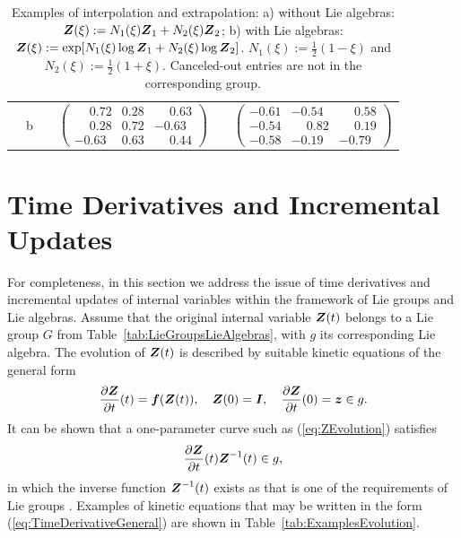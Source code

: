 \documentclass[12pt]{article}
\begin{document}
\begin{table}[htbp]
\begin{center}
\begin{tabular}{ c c c c c c}
      &
      \multirow{2}{*}{b}
      &

      &
      \multirow{2}{*}{
        $\left(
          \begin{smallmatrix}
            \phantom{-}0.72 & 0.28 & \phantom{-}0.63\\
            \phantom{-}0.28 & 0.72 & -0.63\\
            -0.63 & 0.63 & \phantom{-}0.44
          \end{smallmatrix}
        \right)$}
      &

      &
      \multirow{2}{*}{
        $\left(
          \begin{smallmatrix}
            -0.61 & -0.54 & \phantom{-}0.58\\
            -0.54 & \phantom{-}0.82 & \phantom{-}0.19\\
            -0.58 & -0.19 & -0.79
          \end{smallmatrix}
        \right)$}
      \\
      \\
      \bottomrule
    \end{tabular}
    \caption{Examples of interpolation and extrapolation: a) without
      Lie algebras: ${\boldsymbol{Z}}(\xi) := N_1(\xi){\boldsymbol{Z}}_1 + N_2(\xi){\boldsymbol{Z}}_2$; b)
      with Lie algebras: ${\boldsymbol{Z}}(\xi) := \exp[N_1(\xi)\log{\boldsymbol{Z}}_1 +
      N_2(\xi)\log{\boldsymbol{Z}}_2]$. $N_1(\xi):=\frac{1}{2}(1-\xi)$ and
      $N_2(\xi):=\frac{1}{2}(1+\xi)$. Canceled-out entries are not in
      the corresponding group.}
    \label{tab:ExamplesInterpolation}
  \end{center}
\end{table}

\section{Time Derivatives and Incremental Updates}
\label{sec:derivatives}

For completeness, in this section we address the issue of time
derivatives and incremental updates of internal variables within the
framework of Lie groups and Lie algebras. Assume that the original
internal variable ${\boldsymbol{Z}}(t)$ belongs to a Lie group $G$ from
Table~\ref{tab:LieGroupsLieAlgebras}, with $g$ its corresponding Lie
algebra. The evolution of ${\boldsymbol{Z}}(t)$ is described by suitable kinetic
equations of the general form
\begin{equation} \label{eq:ZEvolution}
  \frac{\partial {\boldsymbol{Z}}}{\partial t}(t) = {\boldsymbol{f}}({\boldsymbol{Z}}(t)), \quad
  {\boldsymbol{Z}}(0) = {\boldsymbol{I}}, \quad
  \frac{\partial {\boldsymbol{Z}}}{\partial t}(0) = {\boldsymbol{z}} \in g.
\end{equation}
It can be shown that a one-parameter curve such as
(\ref{eq:ZEvolution}) satisfies
\begin{equation} \label{eq:TimeDerivativeGeneral}
  \frac{\partial {\boldsymbol{Z}}}{\partial t}(t) {\boldsymbol{Z}}^{-1}(t) \in g,
\end{equation}
in which the inverse function ${\boldsymbol{Z}}^{-1}(t)$ exists as that is one of
the requirements of Lie groups
\citep{Procesi:2006,Sepanski:2007,Kosmann-Schwarzbach:2009}. Examples
of kinetic equations that may be written in the form
(\ref{eq:TimeDerivativeGeneral}) are shown in
Table~\ref{tab:ExamplesEvolution}.
\end{document}
